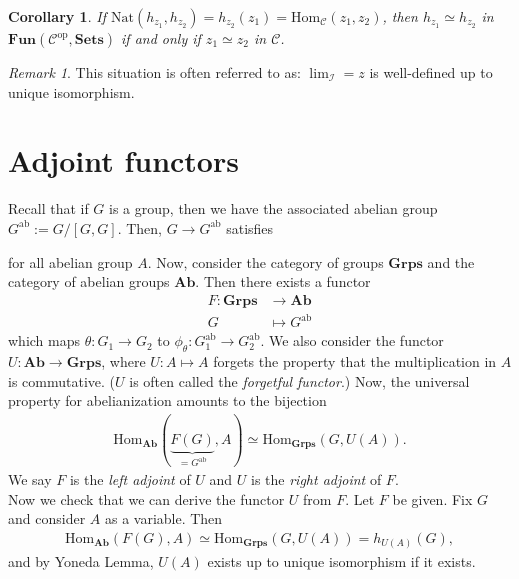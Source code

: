 \documentclass[12pt]{report}
\theoremstyle{plain}
\newtheorem{corollary}[theorem]{Corollary}
\theoremstyle{remark}
\newtheorem*{remark}{Remark}
\theoremstyle{definition}
\newcommand{\Hom}[3]{\mathrm{Hom}_{#3}(#1,#2)}
\begin{document}
\begin{corollary}
    If $\mathrm{Nat}(h_{z_1},h_{z_2}) = h_{z_2}(z_1) = \Hom{z_1}{z_2}{\mathcal{C}}$, then $h_{z_1}\simeq h_{z_2}$ in $\mathbf{Fun}(\mathcal{C}^\mathrm{op},\mathbf{Sets})$ if and only if $z_1\simeq z_2$ in $\mathcal{C}$.
\end{corollary}
\begin{remark}
    This situation is often referred to as: $\lim_{\mathcal{I}}=z$ is well-defined up to unique isomorphism.
\end{remark}


\section{Adjoint functors}

Recall that if $G$ is a group, then we have the associated abelian group $G^\mathrm{ab}:=G/[G,G]$. Then, $G\rightarrow G^\mathrm{ab}$ satisfies
\begin{figure}[H]
\centering
{}
\end{figure}
\noindent for all abelian group $A$. Now, consider the category of groups $\mathbf{Grps}$ and the category of abelian groups $\mathbf{Ab}$. Then there exists a functor
\begin{align*}
    F:\mathbf{Grps} &\rightarrow \mathbf{Ab} \\
    G &\mapsto G^\mathrm{ab}
\end{align*}
which maps $\theta:G_1\rightarrow G_2$ to $\phi_\theta:G_1^\mathrm{ab}\rightarrow G_2^\mathrm{ab}$. We also consider the functor $U:\mathbf{Ab}\rightarrow \mathbf{Grps}$, where $U:A\mapsto A$ forgets the property that the multiplication in $A$ is commutative. ($U$ is often called the \emph{forgetful functor}.) Now, the universal property for abelianization amounts to the bijection
\begin{align*}
    \Hom{\underbrace{F(G)}_{=G^\mathrm{ab}}}{A}{\mathbf{Ab}} \simeq \Hom{G}{U(A)}{\mathbf{Grps}}.
\end{align*}
We say $F$ is the \emph{left adjoint} of $U$ and $U$ is the \emph{right adjoint} of $F$. \\

Now we check that we can derive the functor $U$ from $F$. Let $F$ be given. Fix $G$ and consider $A$ as a variable. Then
\begin{align*}
    \Hom{F(G)}{A}{\mathbf{Ab}} \simeq \Hom{G}{U(A)}{\mathbf{Grps}} = h_{U(A)}(G),
\end{align*}
and by Yoneda Lemma, $U(A)$ exists up to unique isomorphism if it exists.
\end{document}
